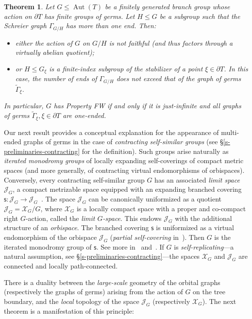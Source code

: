 \documentclass[11pt]{amsart}
\newcommand{\lims}[1][G]{\mathcal{J}_{#1}}
\newcommand{\limg}[1][G]{\mathcal{X}_{#1}}
\newcommand{\aut}{\ensuremath{\operatorname{Aut}}}%
\newcommand{\Gammatilde}{\ensuremath{\widetilde{\Gamma}}}%
\theoremstyle{definition}
\theoremstyle{plain}
\newtheorem{main thm}{Theorem}
\theoremstyle{remark}
\theoremstyle{plain}
\newtheorem{introthm}{Theorem}
\begin{document}
\begin{introthm} \label{t-intro-germs}
Let $G\le \aut(T)$ be a finitely generated branch group whose action on $\partial T$ has finite groups of germs. Let $H\le G$ be a subgroup such that the Schreier graph $\Gamma_{G/H}$ has more than one end. Then:
\begin{itemize}
    \item either the action of $G$ on $G/H$ is not faithful (and thus factors through a virtually abelian quotient); 
\item or $H\le G_\xi$ is a finite-index subgroup of the stabilizer of a point $\xi\in \partial T$. In this case, the number of ends of $\Gamma_{G/H}$ does not exceed that of the graph of germs $\Gammatilde_\xi$. 

\end{itemize} 
In particular, $G$ has Property FW if and only if it is just-infinite and all graphs of germs $\Gammatilde_
\xi, 
\xi\in \partial T$ are one-ended.
\end{introthm}
Our next result provides a conceptual explanation for the appearance of multi-ended graphs of germs in the case of \emph{contracting self-similar groups} (see \S\ref{s-preliminaries-contracting} for the definition). Such groups arise naturally as \emph{iterated monodromy groups} of locally expanding self-coverings of compact metric spaces (and more generally, of contracting virtual endomorphisms of orbispaces). Conversely, every contracting self-similar group $G$ has an associated \emph{limit space} $\lims$, a compact metrizable space equipped with an expanding branched covering $\mathsf{s} \colon \lims \to \lims$~\cite{Nek:book}. The space $\lims$ can be canonically uniformized as a quotient $\lims = \limg / G$, where $\limg$ is a locally compact space with a proper and co-compact right $G$-action, called the \emph{limit $G$-space}. This endows $\lims$ with the additional structure of an \emph{orbispace}. The branched covering $\mathsf{s}$ is uniformized as a virtual endomorphism of the orbispace $\lims$ (\emph{partial self-covering} in~\cite{Nek:book}). Then $G$ is the iterated monodromy group of $\mathsf{s}$. See more in~\cite{Nek:book} and~\cite[Chapter 4]{nek:dyngroups}. If $G$ is \emph{self-replicating}---a natural assumption, see \S\ref{s-preliminaries-contracting}---the spaces $\limg$ and $\lims$ are connected and locally path-connected.

There is a duality between the \emph{large-scale} geometry of the orbital graphs (respectively the graphs of germs) arising from the action of $G$ on the tree boundary, and the \emph{local} topology of the space $\lims$ (respectively $\limg$). The next theorem is a manifestation of this principle:
\end{document}
